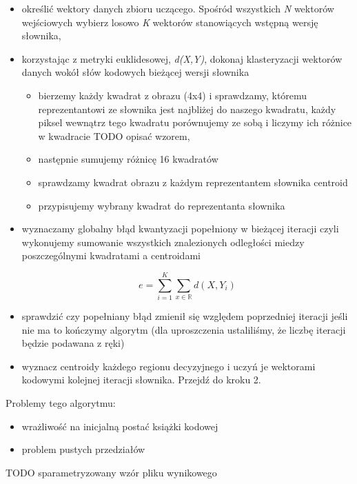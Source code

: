 \documentclass{article}
\begin{document}
\begin{itemize} 
\item określić wektory danych zbioru uczącego. Spośród wszystkich \textit{N} wektorów wejściowych wybierz losowo \textit{K} wektorów stanowiących wstępną wersję słownika,
\item korzystając z metryki euklidesowej, \textit{d(X,Y)}, dokonaj klasteryzacji wektorów danych wokół słów kodowych bieżącej wersji słownika
     \begin{itemize}
        \item bierzemy każdy kwadrat z obrazu (4x4) i sprawdzamy, któremu reprezentantowi ze słownika jest najbliżej do naszego kwadratu, każdy piksel wewnątrz tego kwadratu porównujemy ze sobą i liczymy ich różnice w kwadracie TODO opisać wzorem,
        \item następnie sumujemy różnicę 16 kwadratów
        \item sprawdzamy kwadrat obrazu z każdym reprezentantem słownika centroid
        \item przypisujemy wybrany kwadrat do reprezentanta słownika
     \end{itemize}
\item wyznaczamy globalny błąd kwantyzacji popełniony w bieżącej iteracji czyli wykonujemy sumowanie wszystkich znalezionych odległości miedzy poszczególnymi kwadratami a centroidami 
 
\begin{equation}
e = \sum_{i=1}^K \sum_{x\in\mathbb{R}} d(X, Y_{i}) 
\end{equation}

\item sprawdzić czy popełniany błąd zmienił się względem poprzedniej iteracji jeśli nie ma to kończymy algorytm (dla uproszczenia ustaliliśmy, że liczbę iteracji będzie podawana z ręki)
\item wyznacz centroidy każdego regionu decyzyjnego i uczyń je wektorami kodowymi kolejnej iteracji słownika. Przejdź do kroku 2. 
\end{itemize}
 
Problemy tego algorytmu:

\begin{itemize}
	\item wrażliwość na inicjalną postać książki kodowej 
	\item problem pustych przedziałów 
\end{itemize}

TODO sparametryzowany wzór pliku wynikowego
\end{document}
